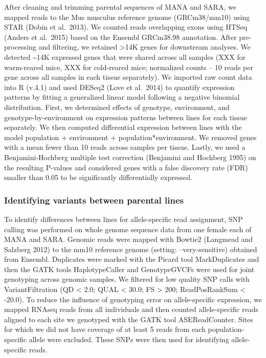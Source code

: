 \documentclass[9pt,twocolumn,twoside,lineno]{pnas-new}
\begin{document}
After cleaning and trimming parental sequences of MANA and SARA, we
mapped reads to the Mus musculus reference genome (GRCm38/mm10) using
STAR (Dobin et al.~2013). We counted reads overlapping exons using HTSeq
(Anders et al.~2015) based on the Ensembl GRCm38.98 annotation. After
pre-processing and filtering, we retained \textgreater14K genes for
downstream analyses. We detected \textasciitilde14K expressed genes that
were shared across all samples (XXX for warm-reared mice, XXX for
cold-reared mice; normalized counts -- 10 reads per gene across all
samples in each tissue separately). We imported raw count data into R
(v.4.1) and used DESeq2 (Love et al.~2014) to quantify expression
patterns by fitting a generalized linear model following a negative
binomial distribution. First, we determined effects of genotype,
environment, and genotype-by-environment on expression patterns between
lines for each tissue separately. We then computed differential
expression between lines with the model population + environment +
population*environment. We removed genes with a mean fewer than 10 reads
across samples per tissue. Lastly, we used a Benjamini-Hochberg multiple
test correction (Benjamini and Hochberg 1995) on the resulting P-values
and considered genes with a false discovery rate (FDR) smaller than 0.05
to be significantly differentially expressed.

\hypertarget{identifying-variants-between-parental-lines}{%
\subsubsection*{Identifying variants between parental
lines}\label{identifying-variants-between-parental-lines}}

To identify differences between lines for allele-specific read
assignment, SNP calling was performed on whole genome sequence data from
one female each of MANA and SARA. Genomic reads were mapped with Bowtie2
(Langmead and Salzberg 2012) to the mm10 reference genome (setting:
--very-sensitive) obtained from Ensembl. Duplicates were marked with the
Picard tool MarkDuplicates and then the GATK tools HaplotypeCaller and
GenotypeGVCFs were used for joint genotyping across genomic samples. We
filtered for low quality SNP calls with VariantFiltration (QD
\textless{} 2.0; QUAL \textless{} 30.0; FS \textgreater{} 200;
ReadPosRankSum \textless{} -20.0). To reduce the influence of genotyping
error on allele-specific expression, we mapped RNAseq reads from all
individuals and then counted allele-specific reads aligned to each site
we genotyped with the GATK tool ASEReadCounter. Sites for which we did
not have coverage of at least 5 reads from each population-specific
allele were excluded. These SNPs were then used for identifying
allele-specific reads.
\end{document}
